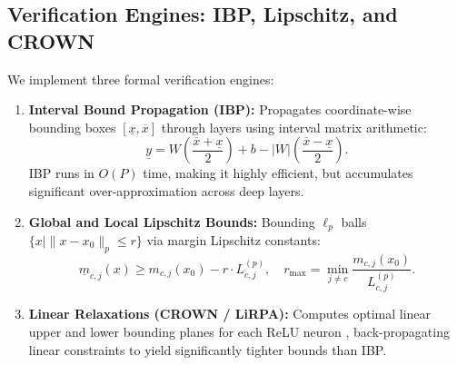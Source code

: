 \documentclass[journal,onecolumn,10pt]{IEEEtran}
\theoremstyle{remark}
\begin{document}
\subsection{Verification Engines: IBP, Lipschitz, and CROWN}
We implement three formal verification engines:
\begin{enumerate}[leftmargin=1.4em]
  \item \textbf{Interval Bound Propagation (IBP):} Propagates coordinate-wise bounding boxes $[\underline{x}, \overline{x}]$ through layers using interval matrix arithmetic:
  \begin{equation}
  \underline{y} = W \left(\frac{\overline{x} + \underline{x}}{2}\right) + b - |W| \left(\frac{\overline{x} - \underline{x}}{2}\right).
  \end{equation}
  IBP runs in $O(P)$ time, making it highly efficient, but accumulates significant over-approximation across deep layers.
  \item \textbf{Global and Local Lipschitz Bounds:} Bounding $\ell_p$ balls $\{x \mid \|x - x_0\|_p \le r\}$ via margin Lipschitz constants:
  \begin{equation}
  \underline{m}_{c,j}(x) \ge m_{c,j}(x_0) - r \cdot L_{c,j}^{(p)}, \quad r_{\max} = \min_{j \neq c} \frac{m_{c,j}(x_0)}{L_{c,j}^{(p)}}.
  \end{equation}
  \item \textbf{Linear Relaxations (CROWN / LiRPA):} Computes optimal linear upper and lower bounding planes for each ReLU neuron \cite{zhang2018crown, xu2020automatic}, back-propagating linear constraints to yield significantly tighter bounds than IBP.
\end{enumerate}
\end{document}

